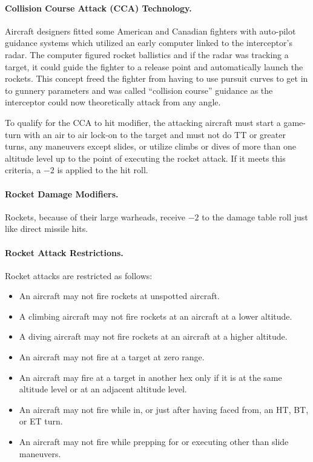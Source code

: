 \paragraph{Collision Course Attack (CCA) Technology.} Aircraft designers fitted some American and Canadian fighters with auto-pilot guidance systems which utilized an early computer linked to the interceptor's radar. The computer figured rocket ballistics and if the radar was tracking a target, it could guide the fighter to a release point and automatically launch the rockets. This concept freed the fighter from having to use pursuit curves to get in to gunnery parameters and was called “collision course” guidance as the interceptor could now theoretically attack from any angle.

To qualify for the CCA to hit modifier, the attacking aircraft must start a game-turn with an air to air lock-on to the target and must not do TT or greater turns, any maneuvers except slides, or utilize climbs or dives of more than one altitude level up to the point of executing the rocket attack. If it meets this criteria, a $-2$ is applied to the hit roll.

\paragraph{Rocket Damage Modifiers.} Rockets, because of their large warheads, receive $-2$ to the damage table roll just like direct missile hits.

\paragraph{Rocket Attack Restrictions.} Rocket attacks are restricted as follows:

\begin{itemize}

    \item An aircraft may not fire rockets at unspotted aircraft.

    \item A climbing aircraft may not fire rockets at an aircraft at a lower altitude.

    \item A diving aircraft may not fire rockets at an aircraft at a higher altitude.

    \item An aircraft may not fire at a target at zero range.

    \item An aircraft  may fire at a target in another hex only if it is at the same altitude level or at an adjacent altitude level.

    \item An aircraft may not fire while in, or just after having faced from, an HT, BT, or ET turn.

    \item An aircraft may not fire while prepping for or executing other than slide maneuvers.

\end{itemize}

